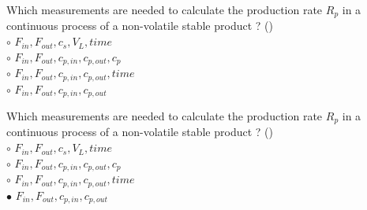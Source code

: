 \documentclass[]{beamer}
\begin{document}
\begin{frame}[shrink] {}
\addtocounter{questions}{1}
\color{blue}
Which measurements are needed to calculate the production rate $R_p$ in a continuous process of a non-volatile stable product ? ()\\
\color{black}
\setlength{\parindent}{-0.4cm}
{\color{red}$\circ$}  $F_{in},F_{out},c_{s},V_{L},time$  \\
{\color{red}$\circ$}  $F_{in},F_{out},c_{p,in},c_{p,out},c_p$ \\
{\color{red}$\circ$}  $F_{in},F_{out},c_{p,in},c_{p,out},time$ \\
{\color{red}$\circ$}  $F_{in},F_{out},c_{p,in},c_{p,out}$\\
\end{frame}
\begin{frame}[shrink] {}
\addtocounter{answers}{1}
\color{blue}
Which measurements are needed to calculate the production rate $R_p$ in a continuous process of a non-volatile stable product ? ()\\
\color{black}
\setlength{\parindent}{-0.4cm}
{\color{red}$\circ$}  $F_{in},F_{out},c_{s},V_{L},time$  \\
{\color{red}$\circ$}  $F_{in},F_{out},c_{p,in},c_{p,out},c_p$ \\
{\color{red}$\circ$}  $F_{in},F_{out},c_{p,in},c_{p,out},time$ \\
{\color{red}$\bullet$}  $F_{in},F_{out},c_{p,in},c_{p,out}$\\
\end{frame}
\end{document}
